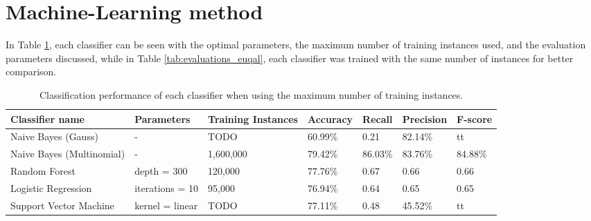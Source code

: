 \section{Machine-Learning method}
In Table \ref{tab:evaluations_max}, each classifier can be seen with the optimal parameters, the maximum number of training instances used, and the evaluation parameters discussed, while in Table \ref{tab:evaluations_euqal}, each classifier was trained with the same number of instances for better comparison.
\begin{table}
\centering
\caption{Classification performance of each classifier when using the maximum number of training instances.}
\begin{tabular}{ |p{3cm}||p{3cm}|p{2cm}|p{1.5cm}|p{1.5cm}|p{1.5cm}|p{1.5cm}| }
 \hline
 Classifier name &          Parameters &             Training Instances &    Accuracy &      Recall &     Precision& F-score \\
 \hline
 Naive Bayes (Gauss)        &-&            TODO&                 60.99\%&        0.21&       82.14\%& tt\\
  \hline
 Naive Bayes (Multinomial)  &-&                     1,600,000&                79.42\%&        86.03\%&       83.76\%& 84.88\%\\
  \hline
 Random Forest              &depth = 300&            120,000&                 77.76\%&        0.67&       0.66& 0.66\\
  \hline
 Logistic Regression        &iterations = 10&            95,000&                 76.94\%&        0.64&       0.65& 0.65\\
  \hline
 Support Vector Machine     &kernel = linear&            TODO&                 77.11\%&        0.48&       45.52\%& tt\\
 \hline
\end{tabular}
\label{tab:evaluations_max}
\end{table}


